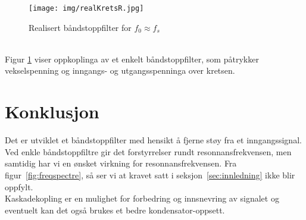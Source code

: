\documentclass[a4paper,11pt,norsk]{article}
\begin{document}
\begin{figure}[htbp]
    \centering
    \texttt{[image: img/realKretsR.jpg]}
    \caption{Realisert båndstoppfilter for $f_0 \approx f_s$}
  \label{fig:realKrets}
\end{figure}
\\
Figur \ref{fig:realKrets} viser oppkoplinga av et enkelt båndstoppfilter, som påtrykker vekselspenning og inngangs- og utgangsspenninga over kretsen.

\newpage
\section{Konklusjon}
\label{sec:konklusjon}
Det er utviklet et båndstoppfilter med hensikt å fjerne støy fra et inngangssignal. Ved enkle båndstoppfiltre gir det forstyrrelser rundt resonnansfrekvensen, men samtidig har vi en ønsket virkning for resonnansfrekvensen. Fra figur~\ref{fig:freqspectre}, så ser vi at kravet satt i seksjon~\ref{sec:innledning} ikke blir oppfylt. \\
Kaskadekopling er en mulighet for forbedring og innsnevring av signalet og eventuelt kan det også brukes et bedre kondensator-oppsett.
\newpage




\appendix 
\end{document}
